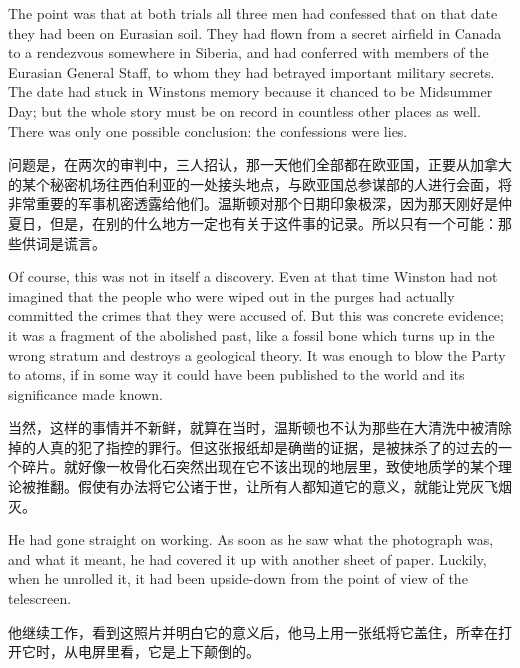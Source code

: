 \begin{paracol}{2}
\switchcolumn*

The point was that at both trials all three men had confessed that on
that date they had been on Eurasian soil. They had flown from a secret
airfield in Canada to a rendezvous somewhere in Siberia, and had
conferred with members of the Eurasian General Staff, to whom they had
betrayed important military secrets. The date had stuck in
Winston\textquotesingle s memory because it chanced to be Midsummer Day;
but the whole story must be on record in countless other places as well.
There was only one possible conclusion: the confessions were lies.

\switchcolumn

问题是，在两次的审判中，三人招认，那一天他们全部都在欧亚国，正要从加拿大的某个秘密机场往西伯利亚的一处接头地点，与欧亚国总参谋部的人进行会面，将非常重要的军事机密透露给他们。温斯顿对那个日期印象极深，因为那天刚好是仲夏日，但是，在别的什么地方一定也有关于这件事的记录。所以只有一个可能：那些供词是谎言。

\switchcolumn*

Of course, this was not in itself a discovery. Even at that time Winston
had not imagined that the people who were wiped out in the purges had
actually committed the crimes that they were accused of. But this was
concrete evidence; it was a fragment of the abolished past, like a
fossil bone which turns up in the wrong stratum and destroys a
geological theory. It was enough to blow the Party to atoms, if in some
way it could have been published to the world and its significance made
known.

\switchcolumn

当然，这样的事情并不新鲜，就算在当时，温斯顿也不认为那些在大清洗中被清除掉的人真的犯了指控的罪行。但这张报纸却是确凿的证据，是被抹杀了的过去的一个碎片。就好像一枚骨化石突然出现在它不该出现的地层里，致使地质学的某个理论被推翻。假使有办法将它公诸于世，让所有人都知道它的意义，就能让党灰飞烟灭。

\switchcolumn*

He had gone straight on working. As soon as he saw what the photograph
was, and what it meant, he had covered it up with another sheet of
paper. Luckily, when he unrolled it, it had been upside-down from the
point of view of the telescreen.

\switchcolumn

他继续工作，看到这照片并明白它的意义后，他马上用一张纸将它盖住，所幸在打开它时，从电屏里看，它是上下颠倒的。

\switchcolumn*


\end{paracol}
